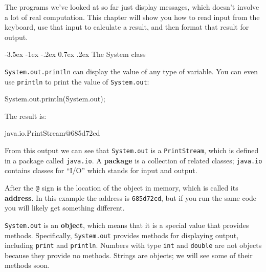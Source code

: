 \documentclass[12pt]{book}
\makeatletter
\theoremstyle{exercise}
\newcommand{\java}[1]{\verb"#1"}
\renewcommand{\section}{\@startsection {section}{1}{\z@}%
    {-3.5ex \@plus -1ex \@minus -.2ex}%
    {0.7ex \@plus.2ex}%
    {\normalfont\Large\bfseries}}
\newcommand{\java}[1]{\lstinline{#1}} %
\makeatother
\begin{document}


The programs we've looked at so far just display messages, which doesn't involve a lot of real computation.
This chapter will show you how to read input from the keyboard, use that input to calculate a result, and then format that result for output.


\section{The System class}
\label{sec:system}


\java{System.out.println} can display the value of any type of variable.
You can even use \java{println} to print the value of \java{System.out}:

\begin{code}
    System.out.println(System.out);
\end{code}

The result is:

\begin{stdout}
java.io.PrintStream@685d72cd
\end{stdout}


From this output we can see that \java{System.out} is a \java{PrintStream}, which is defined in a package called \java{java.io}.
A {\bf package} is a collection of related classes; \java{java.io} contains classes for ``I/O'' which stands for input and output.


After the {\tt @} sign is the location of the object in memory, which is called its {\bf address}.
In this example the address is \java{685d72cd}, but if you run the same code you will likely get something different.


\java{System.out} is an {\bf object}, which means that it is a special value that provides methods.
Specifically, \java{System.out} provides methods for displaying output, including \java{print} and \java{println}.
Numbers with type \java{int} and \java{double} are not objects because they provide no methods.
Strings are objects; we will see some of their methods soon.
\end{document}
